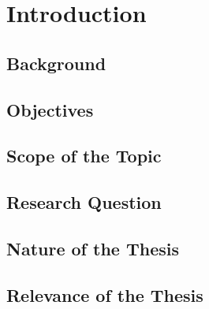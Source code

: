 \chapter{Introduction} \label{introduction}

\section{Background}

\section{Objectives}

\section{Scope of the Topic}

\section{Research Question}

\section{Nature of the Thesis}

\section{Relevance of the Thesis}

